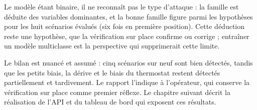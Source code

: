 Le modèle étant binaire, il ne reconnaît pas le type d'attaque : la famille
est déduite des variables dominantes, et la bonne famille figure parmi les
hypothèses pour les huit scénarios évalués (six fois en première position).
Cette déduction reste une hypothèse, que la vérification sur place confirme
ou corrige ; entraîner un modèle multiclasse est la perspective qui
supprimerait cette limite.

Le bilan est nuancé et assumé : cinq scénarios sur neuf sont bien détectés,
tandis que les petits biais, la dérive et le biais du thermostat restent
détectés partiellement et tardivement. Le rapport l'indique à l'opérateur,
qui conserve la vérification sur place comme premier réflexe. Le chapitre
suivant décrit la réalisation de l'API et du tableau de bord qui exposent
ces résultats.
